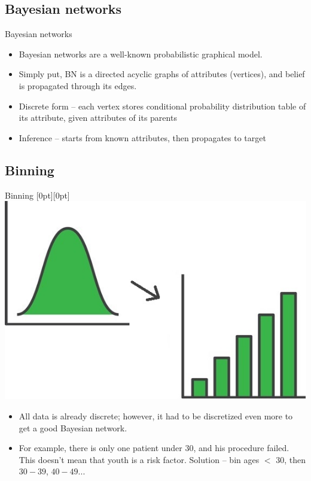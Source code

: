 \documentclass[hyperref={bookmarks=false}]{beamer}
\newcommand{\lenitem}[2][.51\linewidth]{\parbox[t]{#1}{\strut #2\strut}}
\begin{document}
\subsection{Bayesian networks}
\begin{frame}{Bayesian networks}
\begin{itemize}
    \item Bayesian networks are a well-known probabilistic graphical model.
    \item Simply put, BN is a directed acyclic graphs of attributes (vertices), and belief is propagated through its edges.
    \item Discrete form -- each vertex stores conditional probability distribution table of its attribute, given attributes of its parents
    \item Inference -- starts from known attributes, then propagates to target
\end{itemize}
\end{frame}

\subsection{Binning}
\begin{frame}{Binning}
\mbox{}\hfill\raisebox{-\height}[0pt][0pt]{\includegraphics[width=.42\linewidth]{binning.jpeg}}
\vspace*{-\baselineskip}

\begin{itemize}
    \item \lenitem{All data is already discrete; however, it had to be discretized even more to get a good Bayesian network.}

    \item \lenitem{For example, there is only one patient under 30, and his procedure failed. This doesn't mean that youth is a risk factor. Solution -- bin ages $<$ 30, then $30-39$, $40-49$...}
\end{itemize}
\end{frame}
\end{document}
